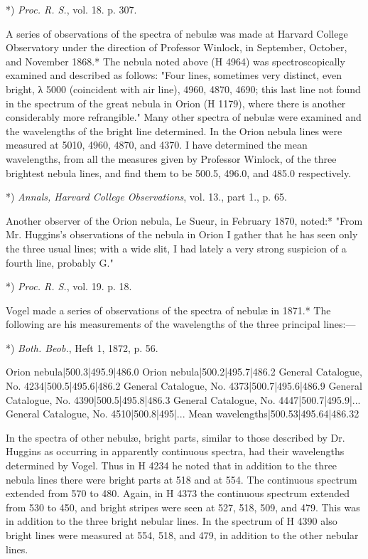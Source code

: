 \documentclass[a4paper, 12pt, oneside, polutonikogreek, english]{article}
\begin{document}
*) \emph{Proc. R. S.}, vol. 18. p. 307.

A series of observations of the spectra of nebulæ was made at Harvard College Observatory under the direction of Professor Winlock, in September, October, and November 1868.* The nebula noted above (H 4964) was spectroscopically examined and described as follows: "Four lines, sometimes very distinct, even bright, λ 5000 (coincident with air line), 4960, 4870, 4690; this last line not found in the spectrum of the great nebula in Orion (H 1179), where there is another considerably more refrangible." Many other spectra of nebulæ were examined and the wavelengths of the bright line determined. In the Orion nebula lines were measured at 5010, 4960, 4870, and 4370. I have determined the mean wavelengths, from all the measures given by Professor Winlock, of the three brightest nebula lines, and find them to be 500.5, 496.0, and 485.0 respectively.

*) \emph{Annals, Harvard College Observations}, vol. 13., part 1., p. 65.

Another observer of the Orion nebula, Le Sueur, in February 1870, noted:* "From Mr. Huggins's observations of the nebula in Orion I gather that he has seen only the three usual lines; with a wide slit, I had lately a very strong suspicion of a fourth line, probably G."

*) \emph{Proc. R. S.}, vol. 19. p. 18.

Vogel made a series of observations of the spectra of nebulæ in 1871.* The following are his measurements of the wavelengths of the three principal lines:---

*) \emph{Both. Beob.}, Heft 1, 1872, p. 56.

Orion nebula|500.3|495.9|486.0 
Orion nebula|500.2|495.7|486.2 
General Catalogue, No. 4234|500.5|495.6|486.2 
General Catalogue, No. 4373|500.7|495.6|486.9 
General Catalogue, No. 4390|500.5|495.8|486.3 
General Catalogue, No. 4447|500.7|495.9|... 
General Catalogue, No. 4510|500.8|495|... 
Mean wavelengths|500.53|495.64|486.32 

In the spectra of other nebulæ, bright parts, similar to those described by Dr. Huggins as occurring in apparently continuous spectra, had their wavelengths determined by Vogel. Thus in H 4234 he noted that in addition to the three nebula lines there were bright parts at 518 and at 554. The continuous spectrum extended from 570 to 480. Again, in H 4373 the continuous spectrum extended from 530 to 450, and bright stripes were seen at 527, 518, 509, and 479. This was in addition to the three bright nebular lines. In the spectrum of H 4390 also bright lines were measured at 554, 518, and 479, in addition to the other nebular lines.
\end{document}
